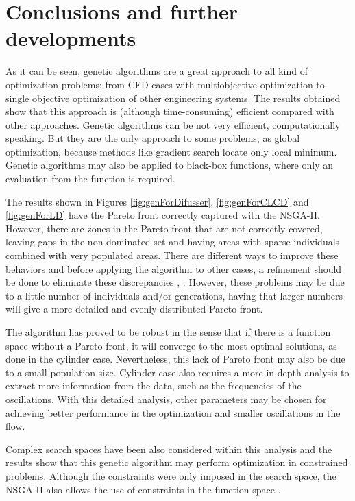 \chapter{Conclusions and further developments}

As it can be seen, genetic algorithms are a great approach to all kind of optimization problems: from CFD cases with multiobjective optimization to single objective optimization of other engineering systems. The results obtained show that this approach is (although time-consuming) efficient compared with other approaches. Genetic algorithms can be not very efficient, computationally speaking. But they are the only approach to some problems, as global optimization, because methods like gradient search locate only local minimum. Genetic algorithms may also be applied to black-box functions, where only an evaluation from the function is required. 

The results shown in Figures \ref{fig:genForDifusser}, \ref{fig:genForCLCD} and \ref{fig:genForLD} have the Pareto front correctly captured with the NSGA-II. However, there are zones in the Pareto front that are not correctly covered, leaving gaps in the non-dominated set and having areas with sparse individuals combined with very populated areas. There are different ways to improve these behaviors and before applying the algorithm to other cases, a refinement should be done to eliminate these discrepancies \cite{chichakly2013improving}, \cite{yuan2014improved}. However, these problems may be due to a little number of individuals and/or generations, having that larger numbers will give a more detailed and evenly distributed Pareto front.

The algorithm has proved to be robust in the sense that if there is a function space without a Pareto front, it will converge to the most optimal solutions, as done in the cylinder case. Nevertheless, this lack of Pareto front may also be due to a small population size. Cylinder case also requires a more in-depth analysis to extract more information from the data, such as the frequencies of the oscillations. With this detailed analysis, other parameters may be chosen for achieving better performance in the optimization and smaller oscillations in the flow.

Complex search spaces have been also considered within this analysis and the results show that this genetic algorithm may perform optimization in constrained problems. Although the constraints were only imposed in the search space, the NSGA-II also allows the use of constraints in the function space \cite{deb2002fast}.

